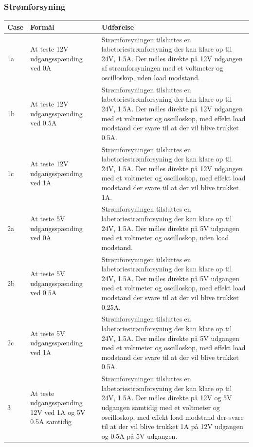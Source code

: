 \subsubsection{Strømforsyning}
\begin{table}[H]
\centering
\begin{tabular}{| p{1cm}  | p{4.5cm} | p{8cm} |}
\hline
Case &Formål &Udførelse\\\hline
1a &At teste 12V udgangsspænding ved 0A &Strømforsyningen tilsluttes en labetoriestrømforsyning der kan klare op til 24V, 1.5A. Der måles direkte på 12V udgangen af strømforsyningen med et voltmeter og oscilloskop, uden load modstand.\\\hline
1b &At teste 12V udgangsspænding ved 0.5A  &Strømforsyningen tilsluttes en labetoriestrømforsyning der kan klare op til 24V, 1.5A. Der måles direkte på 12V udgangen med et voltmeter og oscilloskop, med effekt  load modstand der svare til at der vil blive trukket 0.5A.\\\hline
1c &At teste 12V udgangsspænding ved 1A  &Strømforsyningen tilsluttes en labetoriestrømforsyning der kan klare op til 24V, 1.5A.  Der måles direkte på 12V udgangen med et voltmeter og oscilloskop, med effekt  load modstand der svare til at der vil blive trukket 1A.\\\hline
2a &At teste 5V udgangsspænding ved 0A &Strømforsyningen tilsluttes en labetoriestrømforsyning der kan klare op til 24V, 1.5A. Der måles direkte på 5V udgangen med et voltmeter og oscilloskop, uden load modstand.\\\hline
2b &At teste 5V udgangsspænding ved 0.5A  &Strømforsyningen tilsluttes en labetoriestrømforsyning der kan klare op til 24V, 1.5A. Der måles direkte på 5V udgangen med et voltmeter og oscilloskop, med effekt  load modstand der svare til at der vil blive trukket 0.25A.\\\hline
2c &At teste 5V udgangsspænding ved 1A  &Strømforsyningen tilsluttes en labetoriestrømforsyning der kan klare op til 24V, 1.5A.  Der måles direkte på 5V udgangen med et voltmeter og oscilloskop, med effekt  load modstand der svare til at der vil blive trukket 0.5A.\\\hline
3 &At teste udgangsspænding 12V ved 1A og 5V 0.5A samtidig & Strømforsyningen tilsluttes en labetoriestrømforsyning der kan klare op til 24V, 1.5A. Der måles direkte på 12V og 5V udgangen samtidig med et voltmeter og oscilloskop, med effekt load modstand der svare til at der vil blive trukket 1A på 12V udgangen og 0.5A på 5V udgangen. \\\hline
\end{tabular}
\end{table}
